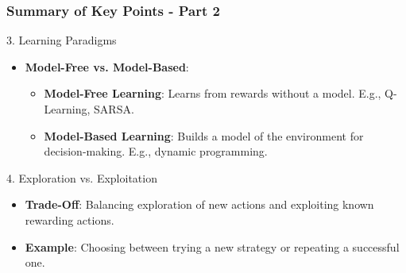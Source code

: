 \documentclass[aspectratio=169]{beamer}
\begin{document}
\begin{frame}[fragile]
    \frametitle{Summary of Key Points - Part 2}
    \begin{block}{3. Learning Paradigms}
        \begin{itemize}
            \item \textbf{Model-Free vs. Model-Based}:
            \begin{itemize}
                \item \textbf{Model-Free Learning}: Learns from rewards without a model. E.g., Q-Learning, SARSA.
                \item \textbf{Model-Based Learning}: Builds a model of the environment for decision-making. E.g., dynamic programming.
            \end{itemize}
        \end{itemize}
    \end{block}

    \begin{block}{4. Exploration vs. Exploitation}
        \begin{itemize}
            \item \textbf{Trade-Off}: Balancing exploration of new actions and exploiting known rewarding actions.
            \item \textbf{Example}: Choosing between trying a new strategy or repeating a successful one.
        \end{itemize}
    \end{block}
\end{frame}
\end{document}
